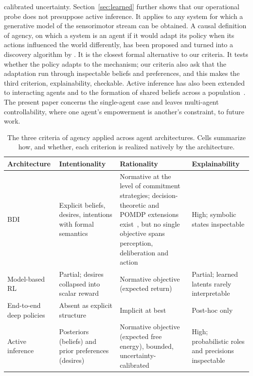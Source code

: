 \documentclass[letterpaper]{article} %
\theoremstyle{definition}
\begin{document}
calibrated uncertainty. Section~\ref{sec:learned} further shows that our operational probe does not presuppose active inference. It applies to any system for which a generative model of the sensorimotor stream can be obtained. A causal definition of agency, on which a system is an agent if it would adapt its policy when its actions influenced the world differently, has been proposed and turned into a discovery algorithm by \citet{kentonDiscoveringAgents2023}. It is the closest formal alternative to our criteria. It tests whether the policy adapts to the mechanism; our criteria also ask that the adaptation run through inspectable beliefs and preferences, and this makes the third criterion, explainability, checkable. Active inference has also been extended to interacting agents and to the formation of shared beliefs across a population~\citep{albarracinEpistemicCommunities2022}. The present paper concerns the single-agent case and leaves multi-agent controllability, where one agent's empowerment is another's constraint, to future work.

\begin{table}[t]
\centering
{\small
\begin{tabular}{|p{2.2cm}|p{2.8cm}|p{2.8cm}|p{2.8cm}|}
\hline
\textbf{Architecture} & \textbf{Intentionality} & \textbf{Rationality} & \textbf{Explainability} \\
\hline
BDI~\citep{raoBDIAgents1995,wooldridgeReasoningRationalAgents2000} & Explicit beliefs, desires, intentions with formal semantics & Normative at the level of commitment strategies; decision-theoretic and POMDP extensions exist~\citep{schutIntentionReconsideration2004,nairHybridBDIPOMDP2005}, but no single objective spans perception, deliberation and action & High; symbolic states inspectable \\
\hline
Model-based RL~\citep{hansenTDMPC2ScalableRobust2024} & Partial; desires collapsed into scalar reward & Normative objective (expected return) & Partial; learned latents rarely interpretable \\
\hline
End-to-end deep policies & Absent as explicit structure & Implicit at best & Post-hoc only~\citep{arrietaExplainableAI2020} \\
\hline
Active inference & Posteriors (beliefs) and prior preferences (desires) & Normative objective (expected free energy), bounded, uncertainty-calibrated & High; probabilistic roles and precisions inspectable \\
\hline
\end{tabular}
}
\caption{The three criteria of agency applied across agent architectures. Cells summarize how, and whether, each criterion is realized natively by the architecture.}
\label{tab:frameworks}
\end{table}
\end{document}
